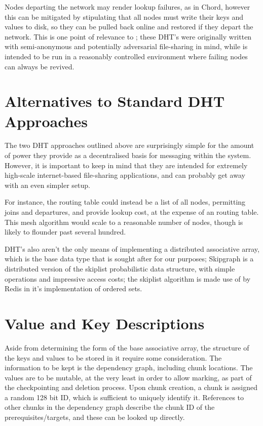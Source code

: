 \documentclass[10pt, a4paper]{article}
\begin{document}
Nodes departing the network may render lookup failures, as in Chord, however this can be mitigated by stipulating that all nodes must write their keys and values to disk, so they can be pulled back online and restored if they depart the network.
This is one point of relevance to \lsr{}; these DHT's were originally written with semi-anonymous and potentially adversarial file-sharing in mind, while \lsr{} is intended to be run in a reasonably controlled environment where failing nodes can always be revived.

\section{Alternatives to Standard DHT Approaches}

The two DHT approaches outlined above are surprisingly simple for the amount of power they provide as a decentralised basis for messaging within the system.
However, it is important to keep in mind that they are intended for extremely high-scale internet-based file-sharing applications, and \lsr{} can probably get away with an even simpler setup.

For instance, the routing table could instead be a list of all nodes, permitting joins and departures, and provide  lookup cost, at the expense of an  routing table.
This mesh algorithm would scale to a reasonable number of nodes, though is likely to flounder past several hundred.

DHT's also aren't the only means of implementing a distributed associative array, which is the base data type that is sought after for our purposes;
Skipgraph is a distributed version of the skiplist probabilistic data structure, with simple operations and impressive access costs; the skiplist algorithm is made use of by Redis in it's implementation of ordered sets. %

\section{Value and Key Descriptions}

Aside from determining the form of the base associative array, the structure of the keys and values to be stored in it require some consideration.
The information to be kept is the dependency graph, including chunk locations.
The values are to be mutable, at the very least in order to allow marking, as part of the checkpointing and deletion process.
Upon chunk creation, a chunk is assigned a random 128 bit ID, which is sufficient to uniquely identify it.
References to other chunks in the dependency graph describe the chunk ID of the prerequisites/targets, and these can be looked up directly.
\end{document}
